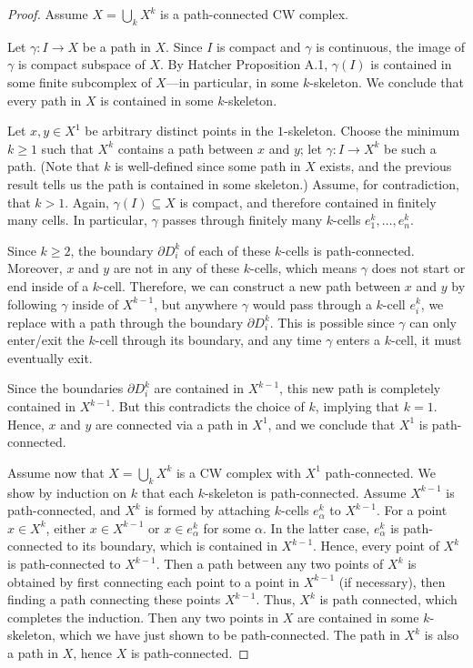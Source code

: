 \documentclass[12pt]{article}
\theoremstyle{definition}
\newcommand{\<}{\langle}
\renewcommand{\>}{\rangle}
\newcommand{\seq}{\subseteq}
\newcommand{\bd}{\partial}
\begin{document}
\begin{proof}
    Assume $X = \bigcup_k X^k$ is a path-connected CW complex.

    Let $\gamma : I \to X$ be a path in $X$.
    Since $I$ is compact and $\gamma$ is continuous, the image of $\gamma$ is compact subspace of $X$. By Hatcher Proposition A.1, $\gamma(I)$ is contained in some finite subcomplex of $X$---in particular, in some $k$-skeleton.
    We conclude that every path in $X$ is contained in some $k$-skeleton.

    Let $x, y \in X^1$ be arbitrary distinct points in the $1$-skeleton.
    Choose the minimum $k \geq 1$ such that $X^k$ contains a path between $x$ and $y$; let $\gamma : I \to X^k$ be such a path.
    (Note that $k$ is well-defined since some path in $X$ exists, and the previous result tells us the path is contained in some skeleton.)
    Assume, for contradiction, that $k > 1$.
    Again, $\gamma(I) \seq X$ is compact, and therefore contained in finitely many cells.
    In particular, $\gamma$ passes through finitely many $k$-cells $e^k_1, \dots, e^k_n$.

    Since $k \geq 2$, the boundary $\bd D^k_i$ of each of these $k$-cells is path-connected.
    Moreover, $x$ and $y$ are not in any of these $k$-cells, which means $\gamma$ does not start or end inside of a $k$-cell.
    Therefore, we can construct a new path between $x$ and $y$ by following $\gamma$ inside of $X^{k-1}$, but anywhere $\gamma$ would pass through a $k$-cell $e^k_i$, we replace with a path through the boundary $\bd D^k_i$. This is possible since $\gamma$ can only enter/exit the $k$-cell through its boundary, and any time $\gamma$ enters a $k$-cell, it must eventually exit.

    Since the boundaries $\bd D^k_i$ are contained in $X^{k-1}$, this new path is completely contained in $X^{k-1}$.
    But this contradicts the choice of $k$, implying that $k = 1$.
    Hence, $x$ and $y$ are connected via a path in $X^1$, and we conclude that $X^1$ is path-connected.

    Assume now that $X = \bigcup_k X^k$ is a CW complex with $X^1$ path-connected.
    We show by induction on $k$ that each $k$-skeleton is path-connected.
    Assume $X^{k-1}$ is path-connected, and $X^k$ is formed by attaching $k$-cells $e^k_\alpha$ to $X^{k-1}$.
    For a point $x \in X^k$, either $x \in X^{k-1}$ or $x \in e^k_\alpha$ for some $\alpha$.
    In the latter case, $e^k_\alpha$ is path-connected to its boundary, which is contained in $X^{k-1}$.
    Hence, every point of $X^k$ is path-connected to $X^{k-1}$.
    Then a path between any two points of $X^k$ is obtained by first connecting each point to a point in $X^{k-1}$ (if necessary), then finding a path connecting these points $X^{k-1}$.
    Thus, $X^k$ is path connected, which completes the induction.
    Then any two points in $X$ are contained in some $k$-skeleton, which we have just shown to be path-connected.
    The path in $X^k$ is also a path in $X$, hence $X$ is path-connected.
\end{proof}
\end{document}
